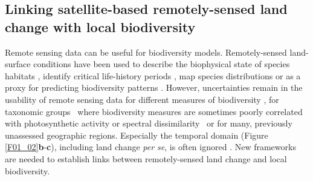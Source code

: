 

\subsection{Linking satellite-based remotely-sensed land change with local biodiversity }
\label{C01_0103}

Remote sensing data can be useful for biodiversity models. Remotely-sensed land-surface conditions have been used to describe the biophysical state of species habitats \citep{Kerr2003}, identify critical life-history periods \citep{Pettorelli2005}, map species distributions \citep{He2015a} or as a proxy for predicting biodiversity patterns \citep{Rowhani2008,Rocchini2015,Hobi2017}. However, uncertainties remain in the usability of remote sensing data for different measures of biodiversity \citep{Oldeland2010}, for taxonomic groups \textendash\ where biodiversity measures are sometimes poorly correlated with photosynthetic activity \citep{Adler2011} or spectral dissimilarity \citep{Schmidtlein2017} \textendash\ or for many, previously unassessed geographic regions. Especially the temporal domain (Figure \ref{F01_02}\textbf{b}-\textbf{c}), including land change \textit{per se}, is often ignored \citep{Kennedy2014}. New frameworks are needed to establish links between remotely-sensed land change and local biodiversity.

